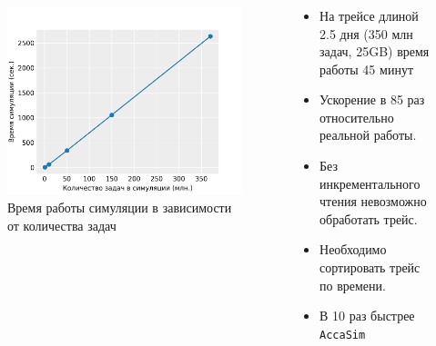 \documentclass[t]{beamer}  %
\begin{document}
\begin{frame}[fragile]
	\frametitle{\insertsection} 
	\framesubtitle{\insertsubsection}
	
	\begin{columns}[t]
		\begin{column}{0.7\linewidth}
			\vspace{-1cm}
	\begin{figure}[H]
		\centering 
		\includegraphics[width=\linewidth]{images/simulation_time}
		\caption*{Время работы симуляции в зависимости от количества задач}
	  \end{figure}
	\end{column} 
	\hspace{-1cm}
	\begin{column}{0.5\linewidth}
		\begin{itemize}
			\item<1-> На трейсе длиной 2.5 дня (350 млн задач, 25GB) время работы 45 минут
			\item<1-> Ускорение в 85 раз относительно реальной работы. 
			\item<2-> Без инкрементального чтения невозможно обработать трейс.
			\item<2-> Необходимо сортировать трейс по времени.
			\item<3-> В 10 раз быстрее \texttt{AccaSim}
		\end{itemize}
	\end{column}
\end{columns}
\end{frame}
\end{document}
